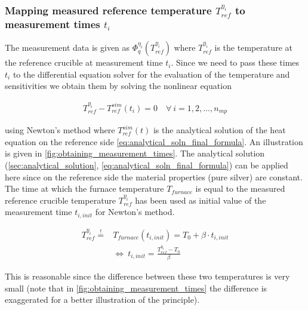 \documentclass{scrartcl}[12pt, halfparskip]
\numberwithin{equation}{section}
\numberwithin{figure}{section}
\numberwithin{table}{section}
\begin{document}
\subsubsection{Mapping measured reference temperature $T_{ref}^{\eta_i}$ to measurement times $t_i$}

The measurement data is given as $\varPhi_q^{\eta_i}(T_{ref}^{\eta_i})$ where $T_{ref}^{\eta_i}$ is the temperature at the reference crucible at measurement time $t_i$. Since we need to pass these times $t_i$ to the differential equation solver for the evaluation of the temperature and sensitivities we obtain them by solving the nonlinear equation 

\begin{align}
	T_{ref}^{\eta_i} - T_{ref}^{sim}(t_i) = 0 \quad \forall \ i = 1,2,...,n_{mp}
	\label{eq:measurement_time_computation}
\end{align}

using Newton's method where $T_{ref}^{sim}(t)$ is the analytical solution of the heat equation on the reference side \cref{eq:analytical_soln_final_formula}. An illustration is given in \cref{fig:obtaining_measurement_times}. The analytical solution (\cref{sec:analytical_solution}, \cref{eq:analytical_soln_final_formula}) can be applied here since on the reference side the material properties (pure silver) are constant. The time at which the furnace temperature $T_{furnace}$ is equal to the measured reference crucible temperature $T_{ref}^{\eta_i}$ has been used as initial value of the measurement time $t_{i,init}$ for Newton's method. 

\begin{align}
	T_{ref}^{\eta_i} \stackrel{!}{=} & T_{furnace}(t_{i,init}) = T_0 + \beta \cdot t_{i,init} \nonumber \\
	& \Leftrightarrow \ t_{i,init} = \frac{T_{ref}^{\eta_i} - T_0}{\beta}
\end{align}

This is reasonable since the difference between these two temperatures is very small (note that in \cref{fig:obtaining_measurement_times} the difference is exaggerated for a better illustration of the principle). \\
\end{document}
